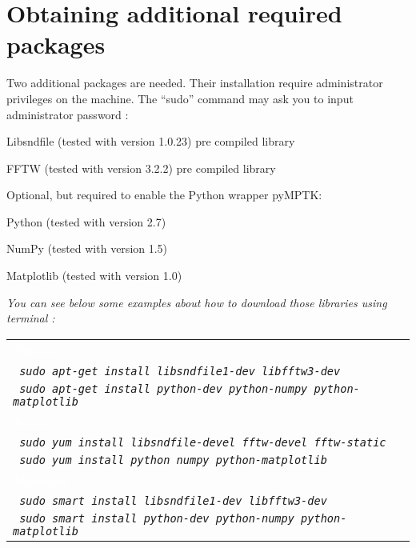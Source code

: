 \section{Obtaining additional required packages}

Two additional packages are needed. Their installation require administrator privileges on the machine. 
The ``sudo'' command may ask you to input administrator password :
\begin{my_itemize}
	\item Libsndfile (tested with version 1.0.23) pre compiled library
	\item FFTW (tested with version 3.2.2) pre compiled library
	\item Optional, but required to enable the Python wrapper pyMPTK:
	\begin{my_itemize}
		\item Python (tested with version 2.7)
		\item NumPy (tested with version 1.5)
		\item Matplotlib (tested with version 1.0)
	\end{my_itemize}
\end{my_itemize}

\noindent \emph{You can see below some examples about how to download those libraries using terminal :}

\vspace{0.3 cm}

\begin{tabular}{|l|}
	\hline
	\rowcolor[gray]{0.35} \textcolor{white}{\emph{Ubuntu}} \\
		\texttt{
			\emph{sudo apt-get install libsndfile1-dev libfftw3-dev}
		}
	\\
		\texttt{
			\emph{sudo apt-get install python-dev python-numpy python-matplotlib}
		}
	\\
	\hline
	\rowcolor[gray]{0.35} \textcolor{white}{\emph{Fedora}} \\
		 \texttt{
		 	\emph{sudo yum install libsndfile-devel fftw-devel fftw-static}
		}
	\\
		 \texttt{
		 	\emph{sudo yum install python numpy python-matplotlib}
		}
	\\
	\hline
	\rowcolor[gray]{0.35} \textcolor{white}{\emph{Mandriva}} \\
		\texttt{
			\emph{sudo smart install libsndfile1-dev libfftw3-dev}
		}
	\\
		\texttt{
			\emph{sudo smart install python-dev python-numpy python-matplotlib}
		}
	\\
	\hline
\end{tabular}

